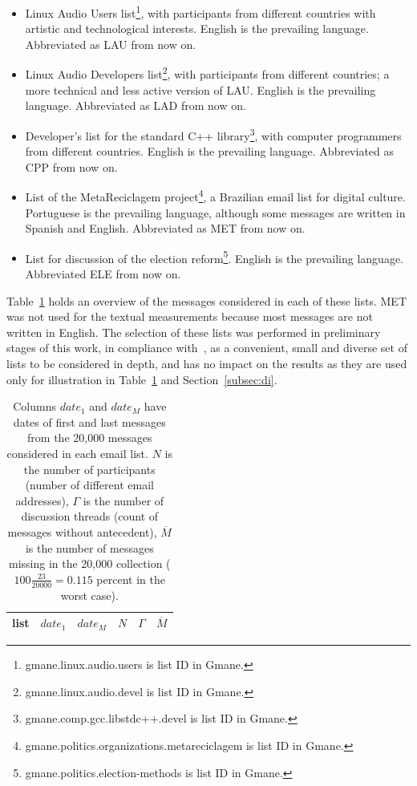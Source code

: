 \documentclass[review]{elsarticle}
\begin{document}
\begin{itemize}
\item Linux Audio Users list\footnote{gmane.linux.audio.users is list ID in Gmane.}, with participants from different countries with artistic and technological interests. English is the prevailing language. Abbreviated as LAU from now on.
\item Linux Audio Developers list\footnote{gmane.linux.audio.devel is list ID in Gmane.}, with participants from different countries; a more technical and less active version of LAU. English is the prevailing language. Abbreviated as LAD from now on.
\item Developer's list for the standard C++ library\footnote{gmane.comp.gcc.libstdc++.devel is list ID in Gmane.}, with computer programmers from different countries. English is the prevailing language. Abbreviated as CPP from now on.
\item List of the MetaReciclagem project\footnote{gmane.politics.organizations.metareciclagem is list ID in Gmane.}, a Brazilian email list for digital culture. Portuguese is the prevailing language, although some messages are written in Spanish and English. Abbreviated as MET from now on.
\item List for discussion of the election reform\footnote{gmane.politics.election-methods is list ID in Gmane.}. English is the prevailing language. Abbreviated ELE from now on.
\end{itemize} 

Table~\ref{tab:genLists} holds an overview of the messages considered in each of these lists.
MET was not used for the textual measurements because most messages are not written in English.
The selection of these lists was performed in preliminary stages of this work,
in compliance with~\cite{stab,thesis}, as a convenient, small and diverse set of lists to be considered in depth, and has no impact on the results as they are used only for illustration in Table~\ref{tab:genLists} and Section~\ref{subsec:di}.

\begin{table}
\centering
\caption{Columns $date_1$ and $date_M$ have dates of first and last messages from the 20,000 messages considered in each email list.
$N$ is the number of participants (number of different email addresses),
$\Gamma$ is the number of discussion threads (count of messages without antecedent),
$\overline{M}$ is the number of messages missing in the 20,000 collection
($100\frac{23}{20000}=0.115$ percent in the worst case).
}
	\def\arraystretch{1.2}
\label{tab:genLists}
\begin{tabular}{l|c c c c c}
list & $date_1$ & $date_{M}$ & $N$ & $\Gamma$ & $\overline{M}$ \\\hline

\end{tabular}
\end{table} 
\end{document}
